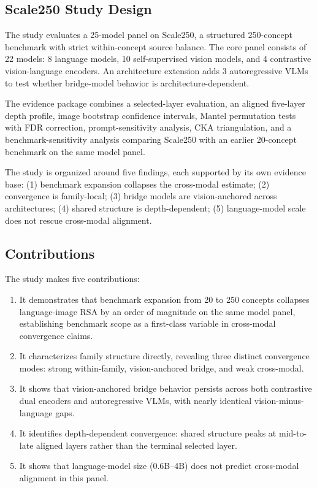 \documentclass[10pt]{article}
\providecommand{\tightlist}{%
  \setlength{\itemsep}{0pt}\setlength{\parskip}{0pt}}
\begin{document}
\subsection{Scale250 Study Design}\label{scale250-study-design}

The study evaluates a 25-model panel on Scale250, a structured
250-concept benchmark with strict within-concept source balance. The
core panel consists of 22 models: 8 language models, 10 self-supervised
vision models, and 4 contrastive vision-language encoders. An
architecture extension adds 3 autoregressive VLMs to test whether
bridge-model behavior is architecture-dependent.

The evidence package combines a selected-layer evaluation, an aligned
five-layer depth profile, image bootstrap confidence intervals, Mantel
permutation tests with FDR correction, prompt-sensitivity analysis, CKA
triangulation, and a benchmark-sensitivity analysis comparing Scale250
with an earlier 20-concept benchmark on the same model panel.

The study is organized around five findings, each supported by its own
evidence base: (1) benchmark expansion collapses the cross-modal
estimate; (2) convergence is family-local; (3) bridge models are
vision-anchored across architectures; (4) shared structure is
depth-dependent; (5) language-model scale does not rescue cross-modal
alignment.

\subsection{Contributions}\label{contributions}

The study makes five contributions:

\begin{enumerate}
\def\labelenumi{\arabic{enumi}.}
\tightlist
\item
  It demonstrates that benchmark expansion from 20 to 250 concepts
  collapses language-image RSA by an order of magnitude on the same
  model panel, establishing benchmark scope as a first-class variable in
  cross-modal convergence claims.
\item
  It characterizes family structure directly, revealing three distinct
  convergence modes: strong within-family, vision-anchored bridge, and
  weak cross-modal.
\item
  It shows that vision-anchored bridge behavior persists across both
  contrastive dual encoders and autoregressive VLMs, with nearly
  identical vision-minus-language gaps.
\item
  It identifies depth-dependent convergence: shared structure peaks at
  mid-to-late aligned layers rather than the terminal selected layer.
\item
  It shows that language-model size (0.6B--4B) does not predict
  cross-modal alignment in this panel.
\end{enumerate}
\end{document}
